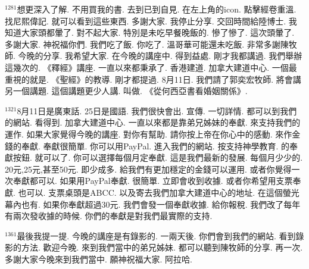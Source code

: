 \documentclass{book}
\begin{document}
$^{1281}$想更深入了解.
不用買我的書.
去到已到自見.
在左上角的icon.
點擊經卷重溫.
找尼熙偉記.
就可以看到這些東西.
多謝大家.
我停止分享.
交回時間給陸博士.
我知道大家頭都暈了.
對不起大家.
特別是未吃早餐晚飯的.
慘了慘了.
這次頭暈了.
多謝大家.
神祝福你們.
我們吃了飯.
你吃了.
溫哥華可能還未吃飯.
非常多謝陳牧師.
今晚的分享.
我希望大家.
在今晚的講座中.
得到益處.
剛才我都講過.
我們舉辦這幾次的.
《釋經》講座.
一直以來都秉承了.
香港建道.
加拿大建道中心.
一個最重視的就是.
《聖經》的教導.
剛才都提過.
8月11日.
我們請了郭奕宏牧師.
將會講另一個講題.
這個講題更少人講.
叫做.
《從何西亞書看婚姻關係》.

$^{1321}$8月11日是廣東話.
25日是國語.
我們很快會出.
宣傳.
一切詳情.
都可以到我們的網站.
看得到.
加拿大建道中心.
一直以來都是靠弟兄姊妹的奉獻.
來支持我們的運作.
如果大家覺得今晚的講座.
對你有幫助.
請你按上帝在你心中的感動.
來作金錢的奉獻.
奉獻很簡單.
你可以用PayPal.
進入我們的網站.
按支持神學教育.
的奉獻按鈕.
就可以了.
你可以選擇每個月定奉獻.
這是我們最新的發展.
每個月少少的.
20元,25元,甚至50元.
即少成多.
給我們有更加穩定的金錢可以運用.
或者你覺得一次奉獻都可以.
如果用PayPal奉獻.
很簡單.
立即會收到收據.
或者你希望用支票奉獻.
也可以.
支票桌頭是ABCC.
以及寄去我們加拿大建道中心的地址.
在這個螢光幕內也有.
如果你奉獻超過30元.
我們會發一個奉獻收據.
給你報稅.
我們改了每年有兩次發收據的時候.
你們的奉獻是對我們最實際的支持.

$^{1361}$最後我提一提.
今晚的講座是有錄影的.
一兩天後.
你們會到我們的網站.
看到錄影的方法.
歡迎今晚.
來到我們當中的弟兄姊妹.
都可以聽到陳牧師的分享.
再一次.
多謝大家今晚來到我們當中.
願神祝福大家.
阿拉哈.
\newpage
\end{document}
